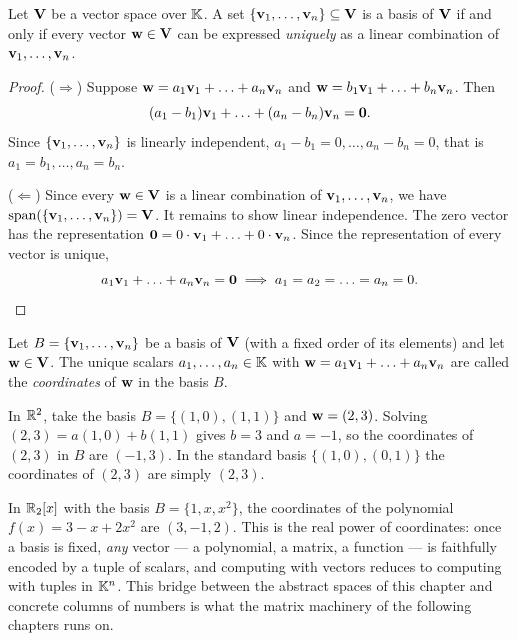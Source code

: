\begin{theorem}
Let $\mathbf{V}$ be a vector space over $\mathbb{K}$. A set $\{\mathbf{v}_1,\ldots,\mathbf{v}_n\}\subseteq \mathbf{V}$ is a basis of $\mathbf{V}$ if and only if
every vector $\mathbf{w}\in \mathbf{V}$ can be expressed \emph{uniquely} as a linear combination of $\mathbf{v}_1,\ldots,\mathbf{v}_n$.
\end{theorem}

\begin{proof}
($\Rightarrow$) Suppose $\mathbf{w}=a_1\mathbf{v}_1+\ldots+a_n\mathbf{v}_n$ and $\mathbf{w}=b_1\mathbf{v}_1+\ldots+b_n\mathbf{v}_n$. Then
\[
(a_1-b_1)\mathbf{v}_1+\ldots+(a_n-b_n)\mathbf{v}_n = \mathbf{0}.
\]
Since $\{\mathbf{v}_1,\ldots,\mathbf{v}_n\}$ is linearly independent, $a_1-b_1=0,\ldots,a_n-b_n=0$, that is
$a_1=b_1,\ldots, a_n=b_n$.

($\Leftarrow$) Since every $\mathbf{w}\in \mathbf{V}$ is a linear combination of $\mathbf{v}_1,\ldots,\mathbf{v}_n$, we have
$\operatorname{span}\!\left(\{\mathbf{v}_1,\ldots,\mathbf{v}_n\}\right) =\mathbf{V}$. It remains to show linear independence. The zero vector has the
representation $\mathbf{0}=0\cdot\mathbf{v}_1+\ldots+0\cdot\mathbf{v}_n$. Since the representation of every vector is unique,
\[
a_1\mathbf{v}_1+\ldots+a_n\mathbf{v}_n =\mathbf{0} \implies a_1=a_2=\ldots =a_n=0. \qedhere
\]
\end{proof}

\begin{definition}
Let $B = \{\mathbf{v}_1,\ldots,\mathbf{v}_n\}$ be a basis of $\mathbf{V}$ (with a fixed order of its elements) and let
$\mathbf{w}\in \mathbf{V}$. The unique scalars $a_1,\ldots,a_n\in\mathbb{K}$ with $\mathbf{w} = a_1\mathbf{v}_1+\ldots+a_n\mathbf{v}_n$ are called the
\emph{coordinates} of $\mathbf{w}$ in the basis $B$.
\end{definition}

\begin{example}
In $\mathbb{R}^2$, take the basis $B = \{(1,0),(1,1)\}$ and $\mathbf{w} = (2,3)$. Solving $(2,3) = a(1,0)+b(1,1)$ gives
$b = 3$ and $a = -1$, so the coordinates of $(2,3)$ in $B$ are $(-1,3)$. In the standard basis
$\{(1,0),(0,1)\}$ the coordinates of $(2,3)$ are simply $(2,3)$.
\end{example}

\begin{example}
In $\mathbb{R}_2[x]$ with the basis $B = \{1,x,x^2\}$, the coordinates of the polynomial $f(x) = 3-x+2x^2$ are
$(3,-1,2)$. This is the real power of coordinates: once a basis is fixed, \emph{any} vector — a polynomial,
a matrix, a function — is faithfully encoded by a tuple of scalars, and computing with vectors reduces to
computing with tuples in $\mathbb{K}^n$. This bridge between the abstract spaces of this chapter and concrete
columns of numbers is what the matrix machinery of the following chapters runs on.
\end{example}

